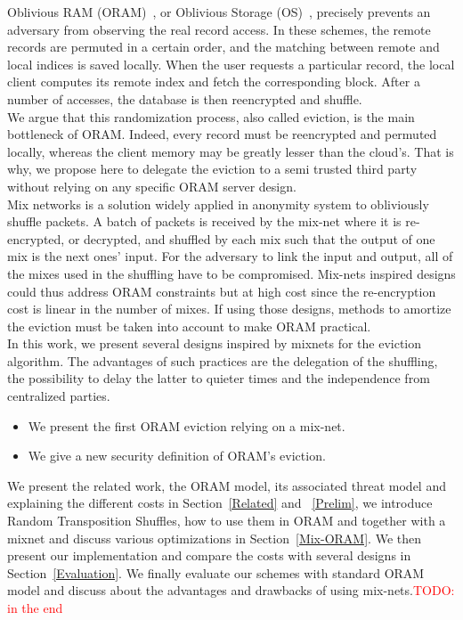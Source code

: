 \documentclass{llncs}
\newcommand{\todo}[1]{\textcolor{red}{TODO: #1}}
\begin{document}
Oblivious RAM (ORAM)~\cite{goldreich87}, or Oblivious Storage (OS)~\cite{boneh2011}, precisely prevents an adversary from observing the real record access. In these schemes, the remote records are permuted in a certain order, and the matching between remote and local indices is saved locally. When the user requests a particular record, the local client  computes its remote index and fetch the corresponding block. After a number of accesses, the database is then reencrypted and shuffle.\\ 
We argue that this randomization process, also called eviction, is the main bottleneck of ORAM. Indeed, every record must be reencrypted and permuted locally, whereas the client memory may be greatly lesser than the cloud's. That is why, we propose here to delegate the eviction to a semi trusted third party without relying on any specific ORAM server design.\\
Mix networks is a solution widely applied in anonymity system to obliviously shuffle packets. A batch of packets is received by the mix-net where it is re-encrypted, or decrypted, and shuffled by each mix such that the output of one mix is the next ones' input. For the adversary to link the input and output, all of the mixes used in the shuffling have to be compromised.
Mix-nets inspired designs could thus address ORAM constraints but at high cost since the re-encryption cost is linear in the number of mixes. If using those designs, methods to amortize the eviction must be taken into account to make ORAM practical.\\

In this work, we present several designs inspired by mixnets for the eviction algorithm.
The advantages of such practices are the delegation of the shuffling, the possibility to delay the latter to quieter times and the independence from centralized parties.

\begin{itemize}
 \item We present the first ORAM eviction relying on a mix-net.
 \item We give a new security definition of ORAM's eviction. %
\end{itemize}

We present the related work, the ORAM model, its associated threat model and explaining the different costs in Section~\ref{Related} and ~\ref{Prelim}, we introduce Random Transposition Shuffles, how to use them in ORAM and together with a mixnet and discuss various optimizations in Section~\ref{Mix-ORAM}. We then present our implementation and compare the costs with several designs in Section~\ref{Evaluation}.
We finally evaluate our schemes with standard ORAM model and discuss about the advantages and drawbacks of using mix-nets.\todo{in the end}
%
\end{document}
